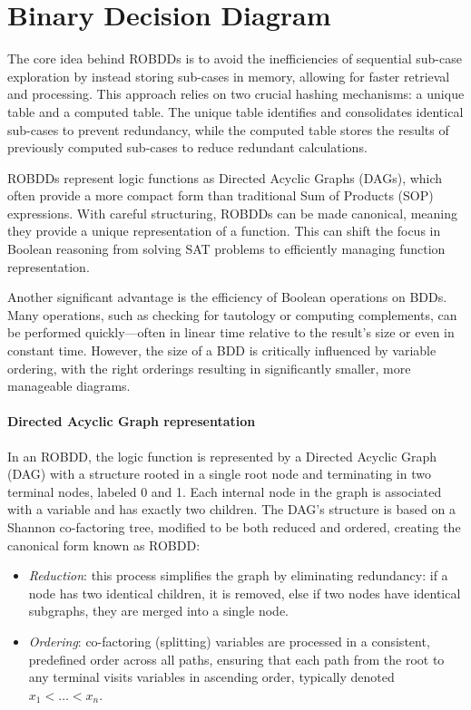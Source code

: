 \section{Binary Decision Diagram}

The core idea behind ROBDDs is to avoid the inefficiencies of sequential sub-case exploration by instead storing sub-cases in memory, allowing for faster retrieval and processing.
This approach relies on two crucial hashing mechanisms: a unique table and a computed table. 
The unique table identifies and consolidates identical sub-cases to prevent redundancy, while the computed table stores the results of previously computed sub-cases to reduce redundant calculations.

ROBDDs represent logic functions as Directed Acyclic Graphs (DAGs), which often provide a more compact form than traditional Sum of Products (SOP) expressions. 
With careful structuring, ROBDDs can be made canonical, meaning they provide a unique representation of a function. 
This can shift the focus in Boolean reasoning from solving SAT problems to efficiently managing function representation.

Another significant advantage is the efficiency of Boolean operations on BDDs. 
Many operations, such as checking for tautology or computing complements, can be performed quickly—often in linear time relative to the result's size or even in constant time. 
However, the size of a BDD is critically influenced by variable ordering, with the right orderings resulting in significantly smaller, more manageable diagrams.

\paragraph*{Directed Acyclic Graph representation}
In an ROBDD, the logic function is represented by a Directed Acyclic Graph (DAG) with a structure rooted in a single root node and terminating in two terminal nodes, labeled 0 and 1. 
Each internal node in the graph is associated with a variable and has exactly two children. 
The DAG's structure is based on a Shannon co-factoring tree, modified to be both reduced and ordered, creating the canonical form known as ROBDD: 
\begin{itemize}
    \item \textit{Reduction}: this process simplifies the graph by eliminating redundancy: if a node has two identical children, it is removed, else if two nodes have identical subgraphs, they are merged into a single node.
    \item \textit{Ordering}: co-factoring (splitting) variables are processed in a consistent, predefined order across all paths, ensuring that each path from the root to any terminal visits variables in ascending order, typically denoted $x_1<\dots<x_n$.
\end{itemize}

